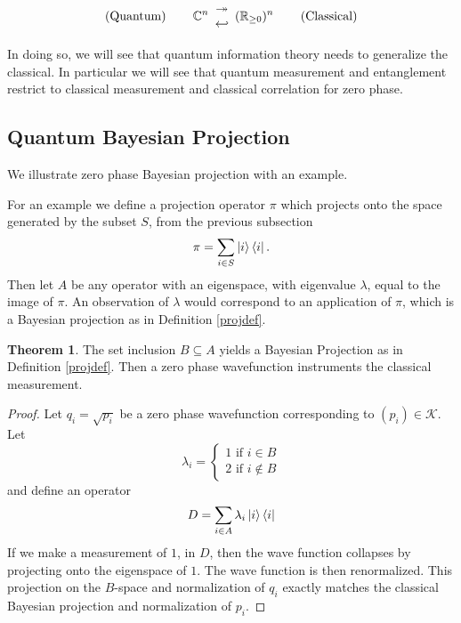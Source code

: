 \documentclass[12pt,a4paper]{article}
\theoremstyle{myrule}
\theoremstyle{postulate}
\theoremstyle{definition}
\newtheorem{theorem}{Theorem}[section]
\begin{document}
{
\renewcommand{\arraystretch}{0.1}
\[
\text{(Quantum)} \hspace{0.3 in}
\mathbb{C}^n \begin{array}{c} \twoheadrightarrow \\ \hookleftarrow \end{array}
(\mathbb{R}_{\ge 0})^n
\hspace{0.3 in} \text{(Classical)} 
\]
}

In doing so, we will see that quantum information theory needs to generalize the classical.  In particular we will see that quantum measurement and entanglement restrict to classical measurement and classical correlation for zero phase.

\subsection{Quantum Bayesian Projection}
We illustrate zero phase Bayesian projection with an example.

For an example we define a projection operator $\pi$ which projects onto the space generated by the subset $S$, from the previous subsection
\[
\pi = \sum_{i \in S} \ket{i} \bra{i}.
\]
Then let $A$ be any operator with an eigenspace, with eigenvalue $\lambda$, equal to the image of $\pi$.  An observation of $\lambda$ would correspond to an application of $\pi$, which is a Bayesian projection as in Definition \ref{projdef}.
\begin{theorem}
  The set inclusion $B \subseteq A$ yields a Bayesian Projection as in Definition \ref{projdef}.  Then a zero phase wavefunction instruments the classical measurement.
\end{theorem}
\begin{proof}
Let $q_i = \sqrt{p_i}$ be a zero phase wavefunction corresponding to $(p_i) \in \mathcal{K}$.  Let
  \[
  \lambda_i = \left\{ \begin{array}{ll} 1 \text{ if } i \in B \\ 2 \text{ if } i \not \in B \end{array} \right.
  \]
and define an operator
\[
  D = \sum_{i \in A} \lambda_i \ket{i} \bra{i}
\]
If we make a measurement of $1$, in $D$, then the wave function collapses by projecting onto the eigenspace of $1$. The wave function is then renormalized.  This projection on the $B$-space and normalization of $q_i$ exactly matches the classical Bayesian projection and normalization of $p_i$.
\end{proof}
\end{document}
